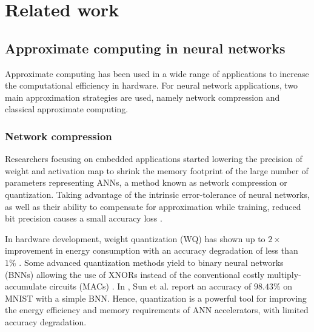 \section{Related work}
\label{sec:related_work}
\subsection{Approximate computing in neural networks}
Approximate computing has been used in a wide range of applications to increase the computational efficiency in hardware\cite{han2013approximate}. For neural network applications, two main approximation strategies are used, namely network compression and classical approximate computing\cite{bouvier2019spiking}.

\subsubsection{Network compression}
Researchers focusing on embedded applications started lowering the precision of weight and activation map to shrink the memory footprint of the large number of parameters representing ANNs, a method known as network compression or quantization. Taking advantage of the intrinsic error-tolerance of neural networks, as well as their ability to compensate for approximation while training, reduced bit precision causes a small accuracy loss \cite{courbariaux2015binaryconnect, han2015deep, hubara2017quantized, rastegari2016xnor}.

In hardware development, weight quantization (WQ) has shown up to $2\times$ improvement in energy consumption with an accuracy degradation of less than $1\%$ \cite{moons20160, whatmough201714}. Some advanced quantization methods yield to binary neural networks (BNNs) allowing the use of XNORs instead of the conventional costly multiply-accumulate circuits (MACs) \cite{rastegari2016xnor}. In \cite{sun2018xnor}, Sun et al. report an accuracy of $98.43\%$ on MNIST with a simple BNN. Hence, quantization is a powerful tool for improving the energy efficiency and memory requirements of ANN accelerators, with limited accuracy degradation.

